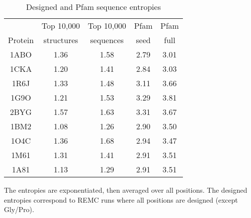 \documentclass[a4paper,12pt]{article}
\begin{document}
\begin{table}[H]                            
\caption{Designed and Pfam sequence entropies}
\label{tab:entropy}                      
\begin{center}
\begin{tabular}{ccccc} \hline \hline  
        & Top 10,000 & Top 10,000 & Pfam & Pfam \\
Protein & structures & sequences  & seed & full \\ \hline
1ABO & 1.36 & 1.58 & 2.79 & 3.01 \\
1CKA & 1.20 & 1.41 & 2.84 & 3.03 \\
1R6J & 1.33 & 1.48 & 3.11 & 3.66 \\
1G9O & 1.21 & 1.53 & 3.29 & 3.81 \\
2BYG & 1.57 & 1.63 & 3.31 & 3.67 \\
1BM2 & 1.08 & 1.26 & 2.90 & 3.50 \\
1O4C & 1.36 & 1.68 & 2.94 & 3.47 \\
1M61 & 1.31 & 1.41 & 2.91 & 3.51 \\
1A81 & 1.13 & 1.29 & 2.91 & 3.51 \\ \hline
\end{tabular}
\end{center}
{\small \noindent The entropies are exponentiated, then averaged over all positions.
The designed entropies correspond to REMC runs where all positions are designed (except Gly/Pro).}
\end{table}

\normalsize

\clearpage
\pagebreak
\end{document}
